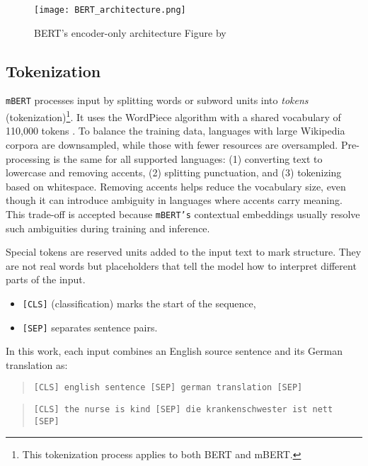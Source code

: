 \begin{figure}
    \centering
	\texttt{[image: BERT\_architecture.png]}	
    \caption[BERT's encoder-only architecture]{BERT's encoder-only architecture Figure by \textcite{smithCompleteGuideBERT2024}}
    \label{fig:bert_arch}
\end{figure}

\subsection{Tokenization}
\texttt{mBERT} processes input by splitting words or subword units into \textit{tokens} (tokenization)\footnote{This tokenization process applies to both BERT and mBERT.}. It uses the WordPiece algorithm with a shared vocabulary of 110,000 tokens \parencite{devlinMultilingualBERTGitHub2018}. To balance the training data, languages with large Wikipedia corpora are downsampled, while those with fewer resources are oversampled. Pre-processing is the same for all supported languages: (1) converting text to lowercase and removing accents, (2) splitting punctuation, and (3) tokenizing based on whitespace. Removing accents helps reduce the vocabulary size, even though it can introduce ambiguity in languages where accents carry meaning. This trade-off is accepted because \texttt{mBERT's} contextual embeddings usually resolve such ambiguities during training and inference.

Special tokens are reserved units added to the input text to mark structure. They are not real words but placeholders that tell the model how to interpret different parts of the input.

\begin{itemize}
	\item \texttt{[CLS]} (classification) marks the start of the sequence,
	\item \texttt{[SEP]} separates sentence pairs.
\end{itemize}

\noindent In this work, each input combines an English source sentence and its German translation as:

\begin{quote}
    \texttt{[CLS] english sentence [SEP] german translation [SEP]}
\end{quote}

\begin{quote}
\texttt{[CLS] the nurse is kind [SEP] die krankenschwester ist nett [SEP]}
\end{quote}

